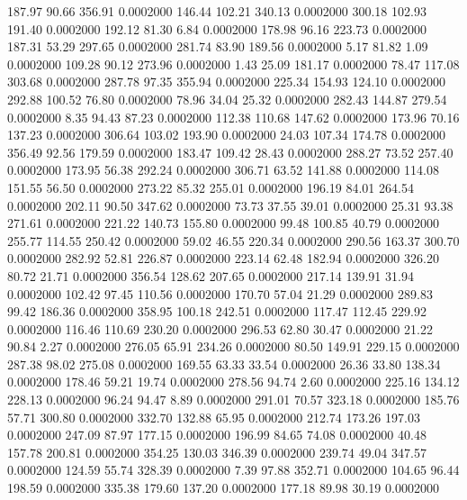  187.97   90.66  356.91   0.0002000
 146.44  102.21  340.13   0.0002000
 300.18  102.93  191.40   0.0002000
 192.12   81.30    6.84   0.0002000
 178.98   96.16  223.73   0.0002000
 187.31   53.29  297.65   0.0002000
 281.74   83.90  189.56   0.0002000
   5.17   81.82    1.09   0.0002000
 109.28   90.12  273.96   0.0002000
   1.43   25.09  181.17   0.0002000
  78.47  117.08  303.68   0.0002000
 287.78   97.35  355.94   0.0002000
 225.34  154.93  124.10   0.0002000
 292.88  100.52   76.80   0.0002000
  78.96   34.04   25.32   0.0002000
 282.43  144.87  279.54   0.0002000
   8.35   94.43   87.23   0.0002000
 112.38  110.68  147.62   0.0002000
 173.96   70.16  137.23   0.0002000
 306.64  103.02  193.90   0.0002000
  24.03  107.34  174.78   0.0002000
 356.49   92.56  179.59   0.0002000
 183.47  109.42   28.43   0.0002000
 288.27   73.52  257.40   0.0002000
 173.95   56.38  292.24   0.0002000
 306.71   63.52  141.88   0.0002000
 114.08  151.55   56.50   0.0002000
 273.22   85.32  255.01   0.0002000
 196.19   84.01  264.54   0.0002000
 202.11   90.50  347.62   0.0002000
  73.73   37.55   39.01   0.0002000
  25.31   93.38  271.61   0.0002000
 221.22  140.73  155.80   0.0002000
  99.48  100.85   40.79   0.0002000
 255.77  114.55  250.42   0.0002000
  59.02   46.55  220.34   0.0002000
 290.56  163.37  300.70   0.0002000
 282.92   52.81  226.87   0.0002000
 223.14   62.48  182.94   0.0002000
 326.20   80.72   21.71   0.0002000
 356.54  128.62  207.65   0.0002000
 217.14  139.91   31.94   0.0002000
 102.42   97.45  110.56   0.0002000
 170.70   57.04   21.29   0.0002000
 289.83   99.42  186.36   0.0002000
 358.95  100.18  242.51   0.0002000
 117.47  112.45  229.92   0.0002000
 116.46  110.69  230.20   0.0002000
 296.53   62.80   30.47   0.0002000
  21.22   90.84    2.27   0.0002000
 276.05   65.91  234.26   0.0002000
  80.50  149.91  229.15   0.0002000
 287.38   98.02  275.08   0.0002000
 169.55   63.33   33.54   0.0002000
  26.36   33.80  138.34   0.0002000
 178.46   59.21   19.74   0.0002000
 278.56   94.74    2.60   0.0002000
 225.16  134.12  228.13   0.0002000
  96.24   94.47    8.89   0.0002000
 291.01   70.57  323.18   0.0002000
 185.76   57.71  300.80   0.0002000
 332.70  132.88   65.95   0.0002000
 212.74  173.26  197.03   0.0002000
 247.09   87.97  177.15   0.0002000
 196.99   84.65   74.08   0.0002000
  40.48  157.78  200.81   0.0002000
 354.25  130.03  346.39   0.0002000
 239.74   49.04  347.57   0.0002000
 124.59   55.74  328.39   0.0002000
   7.39   97.88  352.71   0.0002000
 104.65   96.44  198.59   0.0002000
 335.38  179.60  137.20   0.0002000
 177.18   89.98   30.19   0.0002000
